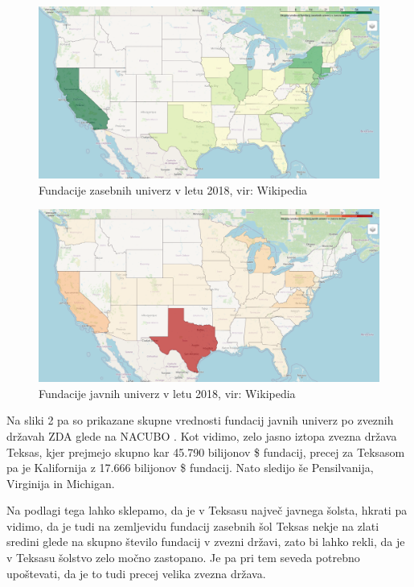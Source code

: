 \documentclass[12pt, a4paper]{article}
\begin{document}
\begin{figure}[!h]
\centering
\includegraphics[width = 15 cm]{grafi_zemljevidi/zemljevid_zasebnih.png}
\caption{Fundacije zasebnih univerz v letu 2018, vir: Wikipedia}
\label{Slika 1}
\end{figure}


\begin{figure}[!h]
\centering
\includegraphics[width = 15 cm]{grafi_zemljevidi/zemljevid_javnih.png}
\caption{Fundacije javnih univerz v letu 2018, vir: Wikipedia}
\label{Slika 2}
\end{figure}

Na sliki 2 pa so prikazane skupne vrednosti fundacij javnih univerz po zveznih državah ZDA glede na NACUBO \cite{wiki}. Kot vidimo, zelo jasno iztopa zvezna država Teksas, kjer prejmejo skupno kar 45.790 bilijonov \$ fundacij, precej za Teksasom pa je Kalifornija z 17.666 bilijonov \$ fundacij. Nato sledijo še Pensilvanija, Virginija in Michigan. 

Na podlagi tega lahko sklepamo, da je v Teksasu največ javnega šolsta, hkrati pa vidimo, da je tudi na zemljevidu fundacij zasebnih šol Teksas nekje na zlati sredini glede na skupno število fundacij v zvezni državi, zato bi lahko rekli, da je v Teksasu šolstvo zelo močno zastopano. Je pa pri tem seveda potrebno upoštevati, da je to tudi precej velika zvezna država. 
\end{document}
